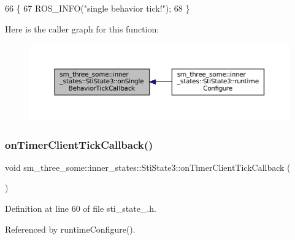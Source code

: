 \begin{DoxyCode}
66   \{
67     ROS\_INFO(\textcolor{stringliteral}{"single behavior tick!"});
68   \}
\end{DoxyCode}
Here is the caller graph for this function\+:
\nopagebreak
\begin{figure}[H]
\begin{center}
\leavevmode
\includegraphics[width=350pt]{structsm__three__some_1_1inner__states_1_1StiState3_a1e26bb6a2e91c1b2a448bd29a50ecaaa_icgraph}
\end{center}
\end{figure}
\mbox{\label{structsm__three__some_1_1inner__states_1_1StiState3_aa9e626e093269683522ed582db1c6bd6}} 
\subsubsection{\texorpdfstring{on\+Timer\+Client\+Tick\+Callback()}{onTimerClientTickCallback()}}
{\footnotesize\ttfamily void sm\+\_\+three\+\_\+some\+::inner\+\_\+states\+::\+Sti\+State3\+::on\+Timer\+Client\+Tick\+Callback (\begin{DoxyParamCaption}{ }\end{DoxyParamCaption})\hspace{0.3cm}{\ttfamily [inline]}}



Definition at line 60 of file sti\+\_\+state\+\_.\+h.



Referenced by runtime\+Configure().


